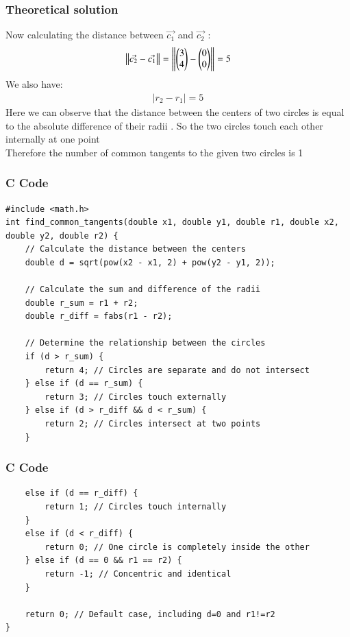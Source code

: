 \documentclass{beamer}
\begin{document}
    \begin{frame}
    \frametitle{Theoretical solution}
  Now calculating the distance between $\Vec{c_1}$ and $\Vec{c_2}$ :
\begin{align}
  \left\lVert\Vec{c_2}-\Vec{c_1}\right\rVert=\left\lVert\begin{pmatrix}3\\4\end{pmatrix}-\begin{pmatrix}0\\0\end{pmatrix}\right\rVert=5
\end{align}
We also have:
\begin{align}
  |r_2-r_1|=5
\end{align}
Here we can observe that  the distance between the centers of two circles is equal to the absolute difference of their radii . So the two circles touch each other internally at one point\\
Therefore the number of common tangents to the given two circles is 1


    \end{frame}
    
    
    
   
    \begin{frame}[fragile]
        \frametitle{C Code}
        \begin{lstlisting}
#include <math.h>
int find_common_tangents(double x1, double y1, double r1, double x2, double y2, double r2) {
    // Calculate the distance between the centers
    double d = sqrt(pow(x2 - x1, 2) + pow(y2 - y1, 2));

    // Calculate the sum and difference of the radii
    double r_sum = r1 + r2;
    double r_diff = fabs(r1 - r2);

    // Determine the relationship between the circles
    if (d > r_sum) {
        return 4; // Circles are separate and do not intersect
    } else if (d == r_sum) {
        return 3; // Circles touch externally
    } else if (d > r_diff && d < r_sum) {
        return 2; // Circles intersect at two points
    } 

        \end{lstlisting}
    \end{frame}
    
    \begin{frame}[fragile]
        \frametitle{C Code}
        \begin{lstlisting}
    else if (d == r_diff) {
        return 1; // Circles touch internally
    } 
    else if (d < r_diff) {
        return 0; // One circle is completely inside the other
    } else if (d == 0 && r1 == r2) {
        return -1; // Concentric and identical
    }

    return 0; // Default case, including d=0 and r1!=r2
}
        \end{lstlisting}
    \end{frame}
    
\end{document}
